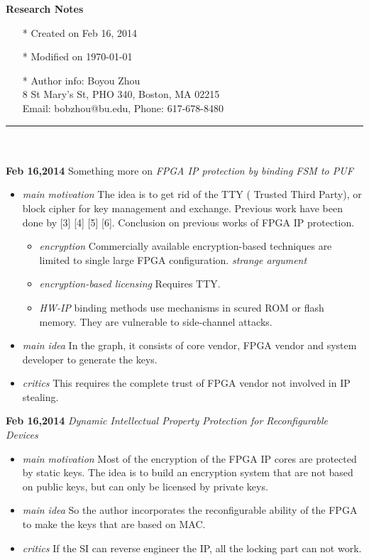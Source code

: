 \documentclass[]{article}
\begin{document}
\pagestyle{empty}
{\large\textbf{Research Notes}}
\begin{itemize}
    \item[*] Created on Feb 16, 2014
    \item[*] Modified on \today
    \item[*] Author info: Boyou Zhou\\
             8 St Mary's St, PHO 340, Boston, MA 02215\\
             Email: bobzhou@bu.edu, Phone: 617-678-8480
\end{itemize}


\rule[-0.1cm]{7.5in}{0.01cm}\\
\\
\noindent \textbf{Feb 16,2014}
Something more on \textit{FPGA IP protection by binding FSM to PUF}
\indent		\begin{itemize}
            \item \textit{main motivation} The idea is to get rid of the TTY (
            Trusted Third Party), or block cipher for key management and
            exchange. Previous work have been done by [3] [4] [5] [6].
            Conclusion on previous works of FPGA IP protection.
                \begin{itemize}
                \item \textit{encryption} Commercially available
                    encryption-based techniques are limited to single large FPGA
                    configuration. \textit{strange argument}
                \item \textit{encryption-based licensing} Requires TTY.
                \item \textit{HW-IP} binding methods use mechanisms in scured
                    ROM or flash memory. They are vulnerable to side-channel
                    attacks.
                \end{itemize}
            \item \textit{main idea} In the graph, it consists of core vendor,
                FPGA vendor and system developer to generate the keys. 
            \item \textit{critics} This requires the complete trust of FPGA
                vendor not involved in IP stealing.
        \end{itemize}

\noindent \textbf{Feb 16,2014}
\textit{Dynamic Intellectual Property Protection for Reconfigurable Devices}
\indent		\begin{itemize}
            \item \textit{main motivation} Most of the encryption of the FPGA IP
            cores are protected by static keys. The idea is to build an
            encryption system that are not based on public keys, but can only be
            licensed by private keys.
            \item \textit{main idea} So the author incorporates the
            reconfigurable ability of the FPGA to make the keys that are based
            on MAC.
            \item \textit{critics} If the SI can reverse engineer the IP, all
            the locking part can not work.
        \end{itemize}
\end{document}
